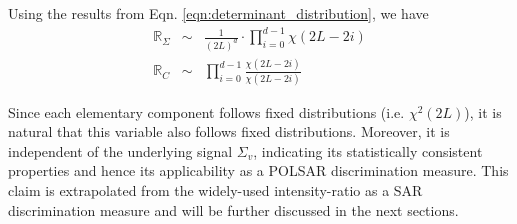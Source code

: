 \documentclass[journal]{IEEEtran}
\begin{document}
Using the results from Eqn. \ref{eqn:determinant_distribution}, %
  we have
\begin{eqnarray}
\mathbb{R}_{\Sigma} &\sim& \frac{1}{(2L)^d} \cdot \prod_{i=0}^{d-1} \chi (2L-2i) \label{eqn:determinant_ratio_distribution} \\
\mathbb{R}_{C} &\sim& \prod_{i=0}^{d-1} \frac{\chi(2L-2i)}{\chi(2L-2i)} \label{eqn:change_ratio_distribution}
\end{eqnarray}


Since each elementary component follows fixed distributions (i.e. $\chi^2(2L)$),
  it is natural that this variable also follows fixed distributions.
Moreover, it is independent of the underlying signal $\Sigma_v$,
  indicating its statistically consistent properties and hence its applicability as a POLSAR discrimination measure.
This claim is extrapolated from the widely-used intensity-ratio as a SAR discrimination measure
  and will be further discussed in the next sections.
\end{document}
